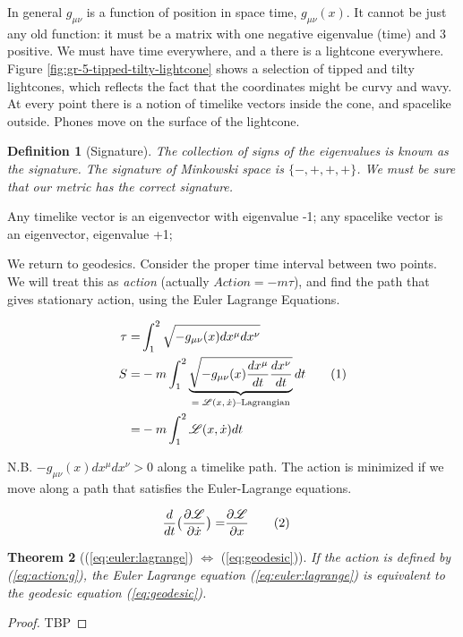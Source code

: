 \documentclass[]{article}
\newcommand\numberthis{\addtocounter{equation}{1}\tag{\theequation}}
\newcommand{\Lagr}{\mathscr{L}}
\newtheorem{thm}{Theorem}
\newtheorem{defn}[thm]{Definition}
\begin{document}
{In general $g_{\mu\nu}$ is a function of position in space time, $g_{\mu\nu}(x)$. It cannot be just any old function: it must be a matrix with one negative eigenvalue (time) and 3 positive. We must have time everywhere, and a there is a lightcone everywhere. Figure \ref{fig:gr-5-tipped-tilty-lightcone} shows a selection of tipped and tilty lightcones, which reflects the fact that the coordinates might be curvy and wavy. At every point there is a notion of timelike vectors inside the cone, and spacelike outside. Phones move on the surface of the lightcone.

\begin{defn}[Signature]
	The collection of signs of the eigenvalues is known as the signature. The signature of Minkowski space is $\{-,+,+,+\}$. We must be sure that our metric has the correct signature.
\end{defn}

Any timelike vector is an eigenvector with eigenvalue -1; any spacelike vector is an eigenvector, eigenvalue +1;

We return to geodesics. Consider the proper time interval between two points. We will treat this as \emph{action} (actually $Action=-m\tau$), and find the path that gives stationary action, using the Euler Lagrange Equations\cite{susskind2013quantum}.

\begin{align*}
	\tau =& \int_{1}^{2} \sqrt{-g_{\mu\nu}(x) dx^\mu dx^\nu } \\
	S =& -m \int_{1}^{2} \underbrace{\sqrt{-g_{\mu\nu}(x) \frac{dx^\mu}{dt} \frac{dx^\nu}{dt} }}_\text{$=\Lagr(x,\dot{x})$--Lagrangian}  dt \numberthis \label{eq:action:g}\\
	=& -m \int_{1}^{2} \Lagr(x,\dot{x}) dt
\end{align*}

 N.B. $-g_{\mu\nu}(x) dx^\mu dx^\nu>0$ along a timelike path. The action is minimized if we move along a path that satisfies the Euler-Lagrange equations.
 
\begin{align*}
 	\frac{d}{dt}\big(\frac{\partial \Lagr}{\partial \dot{x}}\big) =& \frac{\partial \Lagr}{\partial x} \numberthis \label{eq:euler:lagrange}
\end{align*}

\begin{thm}[(\ref{eq:euler:lagrange}) $\iff$ 	(\ref{eq:geodesic})]
	If the action is defined by (\ref{eq:action:g}), the Euler Lagrange equation (\ref{eq:euler:lagrange}) is equivalent to the geodesic equation (\ref{eq:geodesic}).
\end{thm}
\begin{proof}
	TBP
\end{proof}

}
\end{document}
